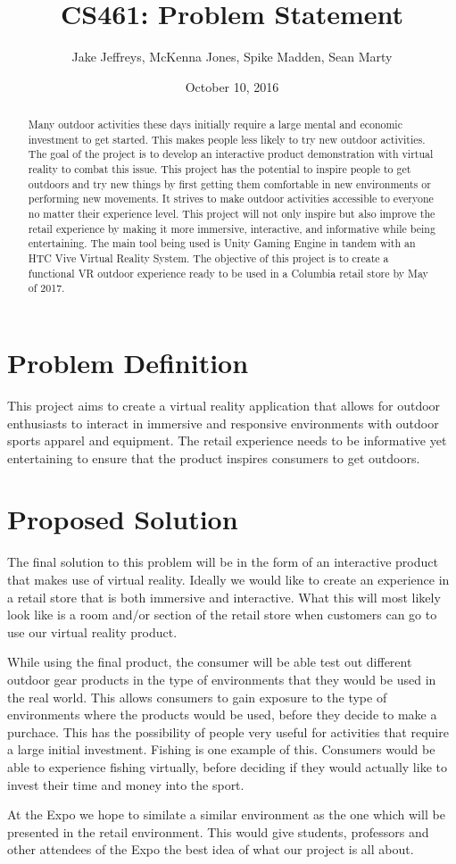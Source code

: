 \documentclass[letterpaper,10pt,titlepage]{article}
\title{CS461: Problem Statement}
\author{Jake Jeffreys, McKenna Jones, Spike Madden, Sean Marty}
\date{October 10, 2016}
\begin{document}
\begin{titlepage}
\maketitle
\begin{abstract}
Many outdoor activities these days initially require a large mental and economic
investment to get started. This makes people less likely to try new outdoor
activities. The goal of the project is to develop an interactive product
demonstration with virtual reality to combat this issue. This project has the
potential to inspire people to get outdoors and try new things by first getting
them comfortable in new environments or performing new movements. It strives to
make outdoor activities accessible to everyone no matter their experience level.
This project will not only inspire but also improve the retail experience by
making it more immersive, interactive, and informative while being
entertaining. The main tool being used is Unity Gaming Engine in tandem with an
HTC Vive Virtual Reality System. The objective of this project is to create a
functional VR outdoor experience ready to be used in a Columbia retail store by
May of 2017.
\end{abstract}
\end{titlepage}

\section{Problem Definition}
This project aims to create a virtual reality application that allows for outdoor enthusiasts to interact in immersive and responsive environments with outdoor sports apparel and equipment. The retail experience needs to be informative yet entertaining to ensure that the product inspires consumers to get outdoors.

\section{Proposed Solution}
The final solution to this problem will be in the form of an interactive product that makes use of virtual reality. Ideally we would like to create an experience in a retail store that is both immersive and interactive. What this will most likely look like is a room and/or section of the retail store when customers can go to use our virtual reality product.

While using the final product, the consumer will be able test out different outdoor gear products in the type of environments that they would be used in the real world. This allows consumers to gain exposure to the type of environments where the products would be used, before they decide to make a purchace. This has the possibility of people very useful for activities that require a large initial investment. Fishing is one example of this. Consumers would be able to experience fishing virtually, before deciding if they would actually like to invest their time and money into the sport.

At the Expo we hope to similate a similar environment as the one which will be presented in the retail environment. This would give students, professors and other attendees of the Expo the best idea of what our project is all about.
\end{document}
